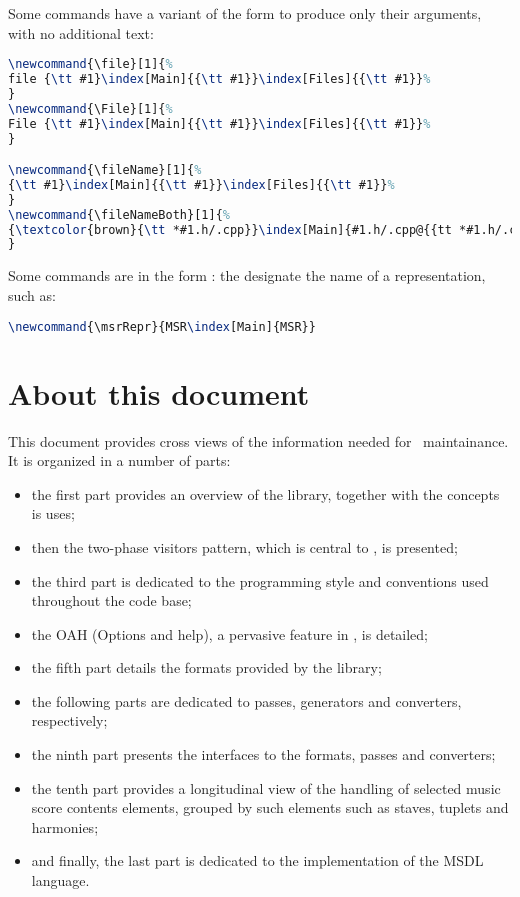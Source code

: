 Some commands have a variant of the form  to produce only their arguments, with no additional text:
\begin{lstlisting}[language=Latex]
\newcommand{\file}[1]{%
file {\tt #1}\index[Main]{{\tt #1}}\index[Files]{{\tt #1}}%
}
\newcommand{\File}[1]{%
File {\tt #1}\index[Main]{{\tt #1}}\index[Files]{{\tt #1}}%
}

\newcommand{\fileName}[1]{%
{\tt #1}\index[Main]{{\tt #1}}\index[Files]{{\tt #1}}%
}
\newcommand{\fileNameBoth}[1]{%
{\textcolor{brown}{\tt *#1.h/.cpp}}\index[Main]{#1.h/.cpp@{{tt *#1.h/.cpp}}}\index[Files]{#1.h/.cpp@{{tt *#1.h/.cpp}}}%
}
\end{lstlisting}

Some commands are in the form  : the designate the name of a representation, such as:
\begin{lstlisting}[language=Latex]
\newcommand{\msrRepr}{MSR\index[Main]{MSR}}
\end{lstlisting}


\section{About this document}

This document provides cross views of the information needed for \mf\ maintainance. It is organized in a number of parts:
\begin{itemize}
\item the first part provides an overview of the library, together with the concepts is uses;
\item then the two-phase visitors pattern, which is central to \mf, is presented;
\item the third part is dedicated to the programming style and conventions used throughout the code base;
\item the OAH (Options and help), a pervasive feature in \mf, is detailed;
\item the fifth part details the formats provided by the library;
\item the following parts are dedicated to passes, generators and converters, respectively;
\item the ninth part presents the interfaces to the formats, passes and converters;
\item the tenth part provides a longitudinal view of the handling of selected music score contents elements, grouped by such elements such as staves, tuplets and harmonies;
\item and finally, the last part is dedicated to the implementation of the MSDL language.
\end{itemize}


